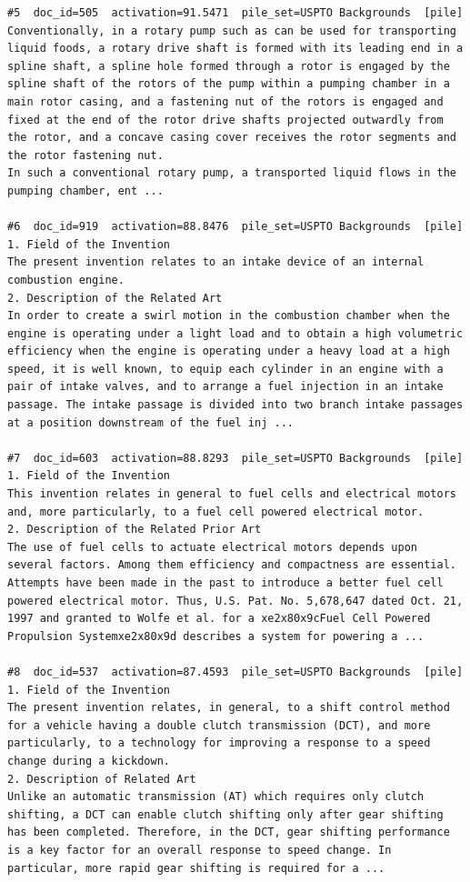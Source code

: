 \begin{verbatim}
#5  doc_id=505  activation=91.5471  pile_set=USPTO Backgrounds  [pile]
Conventionally, in a rotary pump such as can be used for transporting liquid foods, a rotary drive shaft is formed with its leading end in a spline shaft, a spline hole formed through a rotor is engaged by the spline shaft of the rotors of the pump within a pumping chamber in a main rotor casing, and a fastening nut of the rotors is engaged and fixed at the end of the rotor drive shafts projected outwardly from the rotor, and a concave casing cover receives the rotor segments and the rotor fastening nut.
In such a conventional rotary pump, a transported liquid flows in the pumping chamber, ent ...

#6  doc_id=919  activation=88.8476  pile_set=USPTO Backgrounds  [pile]
1. Field of the Invention
The present invention relates to an intake device of an internal combustion engine.
2. Description of the Related Art
In order to create a swirl motion in the combustion chamber when the engine is operating under a light load and to obtain a high volumetric efficiency when the engine is operating under a heavy load at a high speed, it is well known, to equip each cylinder in an engine with a pair of intake valves, and to arrange a fuel injection in an intake passage. The intake passage is divided into two branch intake passages at a position downstream of the fuel inj ...

#7  doc_id=603  activation=88.8293  pile_set=USPTO Backgrounds  [pile]
1. Field of the Invention
This invention relates in general to fuel cells and electrical motors and, more particularly, to a fuel cell powered electrical motor.
2. Description of the Related Prior Art
The use of fuel cells to actuate electrical motors depends upon several factors. Among them efficiency and compactness are essential.
Attempts have been made in the past to introduce a better fuel cell powered electrical motor. Thus, U.S. Pat. No. 5,678,647 dated Oct. 21, 1997 and granted to Wolfe et al. for a xe2x80x9cFuel Cell Powered Propulsion Systemxe2x80x9d describes a system for powering a ...

#8  doc_id=537  activation=87.4593  pile_set=USPTO Backgrounds  [pile]
1. Field of the Invention
The present invention relates, in general, to a shift control method for a vehicle having a double clutch transmission (DCT), and more particularly, to a technology for improving a response to a speed change during a kickdown.
2. Description of Related Art
Unlike an automatic transmission (AT) which requires only clutch shifting, a DCT can enable clutch shifting only after gear shifting has been completed. Therefore, in the DCT, gear shifting performance is a key factor for an overall response to speed change. In particular, more rapid gear shifting is required for a ...


\end{verbatim}
